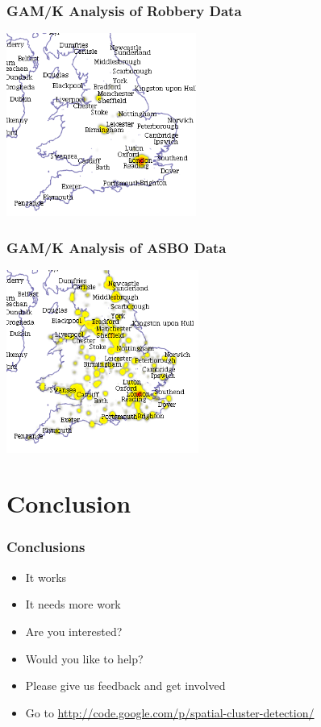 \documentclass{beamer}
\begin{document}
\begin{frame}[t]
\frametitle{GAM/K Analysis of Robbery Data}
\includegraphics[height=6.0cm]{gam_robbery.png}
\end{frame}

\begin{frame}[t]
\frametitle{GAM/K Analysis of ASBO Data}
\includegraphics[height=6.0cm]{gam_asbo.png}
\end{frame}


\section{Conclusion}

\begin{frame}[t]
\frametitle{Conclusions}
\begin{itemize}
  \item It works
  \item It needs more work 
  \item Are you interested?
  \item Would you like to help?
  \item Please give us feedback and get involved
  \item Go to \href{http://code.google.com/p/spatial-cluster-detection/}{http://code.google.com/p/spatial-cluster-detection/}
\end{itemize}
\end{frame}
\end{document}
